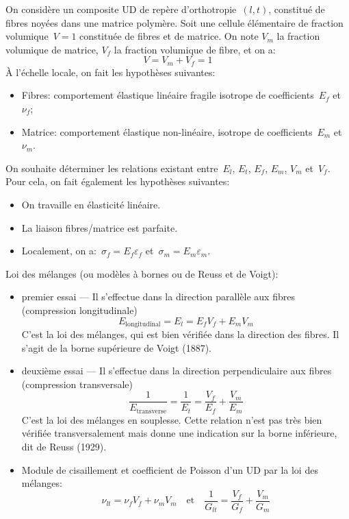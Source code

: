 On considère un composite UD de repère d'orthotropie~$(l,t)$, constitué de fibres noyées dans
une matrice polymère. Soit une cellule élémentaire de fraction volumique~$V = 1$ constituée de
fibres et de matrice. On note
$V_m$ la fraction volumique de matrice,
$V_f$ la fraction volumique de fibre, et on a:
\begin{equation} V = V_m + V_f =1 \end{equation}
\medskipvm
À l'échelle locale, on fait les hypothèses suivantes:
\begin{itemize}
  \item Fibres: comportement élastique linéaire fragile isotrope de coefficients~$E_f$ et~$\nu_f$;
  \item Matrice: comportement élastique non-linéaire, isotrope de coefficients~$E_m$ et~$\nu_m$.
\end{itemize}
\medskipvm
On souhaite déterminer les relations existant entre~$E_l$, $E_t$, $E_f$, $E_m$, $V_m$ et~$V_f$.
\medskipvm
Pour cela, on fait également les hypothèses suivantes:
\begin{itemize}
  \item On travaille en élasticité linéaire.
  \item La liaison fibres/matrice est parfaite.
  \item Localement, on a:~$\sigma_f = E_f \varepsilon_f$ et~$\sigma_m = E_m \varepsilon_m$.
\end{itemize}
\medskipvm
Loi des mélanges (ou modèles à bornes ou de Reuss et de Voigt):
\begin{itemize}
	\item premier essai --- Il s'effectue dans la direction parallèle aux fibres (compression longitudinale)
		\begin{equation} E_{\text{longitudinal}}=E_l=E_fV_f+E_mV_m \end{equation}
		C'est la loi des mélanges, qui est bien vérifiée dans la direction des fibres.
		Il s'agit de la borne supérieure de Voigt (1887).
	\item deuxième essai --- Il s'effectue dans la direction perpendiculaire aux fibres (compression transversale)
		\begin{equation}\dfrac1{E_{\text{transverse}}}=\dfrac1{E_t} = \dfrac{V_f}{E_f}+\dfrac{V_m}{E_m}\end{equation}
		C'est la loi des mélanges en souplesse.
		Cette relation n'est pas très bien vérifiée transversalement mais donne une
		indication sur la borne inférieure, dit de Reuss (1929).
	\item Module de cisaillement et coefficient de Poisson
		d'un UD par la loi des mélanges:
		\begin{equation}\nu_{lt}=\nu_fV_f+\nu_mV_m\quad\text{et}\quad\dfrac1{G_{lt}} = \dfrac{V_f}{G_f}+\dfrac{V_m}{G_m}\end{equation}
\end{itemize}

